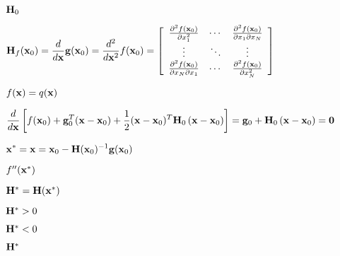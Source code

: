 \documentclass{article}
\def\lthtmlcheckvsize{\ifdim\ht\sizebox<\vsize 
  \ifdim\wd\sizebox<\hsize\expandafter\hfill\fi \expandafter\vfill
  \else\expandafter\vss\fi}%
\begin{document}
{\newpage\clearpage
{}%
$\displaystyle {\bf H}_0$%
\lthtmlindisplaymathZ
\lthtmlcheckvsize\clearpage}

{\newpage\clearpage
{}%
$\displaystyle {\bf H}_f({\bf x}_0)=\frac{d}{d{\bf x}} {\bf g}({\bf x}_0)
=\frac{d^2}{d{\bf x}^2} f({\bf x}_0)
=\left[\begin{array}{ccc} \frac{\partial^2 f({\bf x}_0)}{\partial x_1^2} &
\cdots & \frac{\partial^2 f({\bf x}_0)}{\partial x_1\partial x_N} \\
\vdots & \ddots & \vdots \\
\frac{\partial^2 f({\bf x}_0)}{\partial x_N\partial x_1} &
\cdots & \frac{\partial^2 f({\bf x}_0)}{\partial x_N^2}
\end{array}\right]$%
\lthtmlindisplaymathZ
\lthtmlcheckvsize\clearpage}

{\newpage\clearpage
{}%
$ f({\bf x})=q({\bf x})$%
\lthtmlindisplaymathZ
\lthtmlcheckvsize\clearpage}

{\newpage\clearpage
{}%
$\displaystyle \frac{d}{d{\bf x}}\left[f({\bf x}_0)+{\bf g}_0^T({\bf x}-{\bf x}_0)
+\frac{1}{2}({\bf x}-{\bf x}_0)^T{\bf H}_0\,({\bf x}-{\bf x}_0)\right]
={\bf g}_0+{\bf H}_0\,({\bf x}-{\bf x}_0)={\bf0}$%
\lthtmlindisplaymathZ
\lthtmlcheckvsize\clearpage}

{\newpage\clearpage
{}%
$\displaystyle {\bf x}^*={\bf x}={\bf x}_0-{\bf H}({\bf x}_0)^{-1}{\bf g}({\bf x}_0)$%
\lthtmlindisplaymathZ
\lthtmlcheckvsize\clearpage}

{\newpage\clearpage
{}%
$ f''({\bf x}^*)$%
\lthtmlindisplaymathZ
\lthtmlcheckvsize\clearpage}

{\newpage\clearpage
{}%
$ {\bf H}^*={\bf H}({\bf x}^*)$%
\lthtmlindisplaymathZ
\lthtmlcheckvsize\clearpage}

{\newpage\clearpage
{}%
$ {\bf H}^*>0$%
\lthtmlindisplaymathZ
\lthtmlcheckvsize\clearpage}

{\newpage\clearpage
{}%
$ {\bf H}^*<0$%
\lthtmlindisplaymathZ
\lthtmlcheckvsize\clearpage}

{\newpage\clearpage
{}%
$ {\bf H}^*$%
\lthtmlindisplaymathZ
\lthtmlcheckvsize\clearpage}
\end{document}
